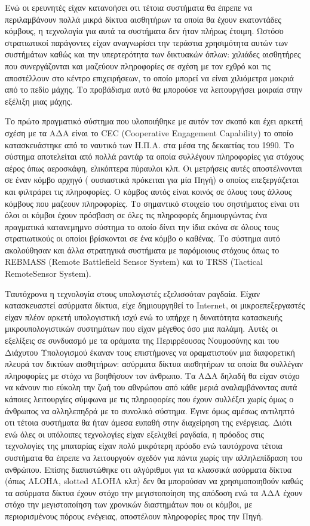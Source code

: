 Ενώ οι ερευνητές είχαν κατανοήσει οτι τέτοια συστήματα θα έπρεπε να περιλαμβάνουν πολλά μικρά δίκτυα αισθητήρων τα οποία θα έχουν εκατοντάδες κόμβους, η τεχνολογία
για αυτά τα συστήματα δεν ήταν πλήρως έτοιμη.
Ωστόσο στρατιωτικοί παράγοντες είχαν αναγνωρίσει την τεράστια χρησιμότητα αυτών των συστήμάτων καθώς και την υπερτερότητα των δικτυακών όπλων: χιλιάδες αισθητήρες που
συνεργάζονται και μαζεύουν πληροφορίες σε σχέση με τον εχθρό και τις αποστέλλουν στο κέντρο επιχειρήσεων, το οποίο μπορεί να είναι χιλιόμετρα μακριά από το πεδίο
μάχης.
Το προβάδισμα αυτό θα μπορούσε να λειτουργήσει μοιραία στην εξέλιξη μιας μάχης.

Το πρώτο πραγματικό σύστημα που υλοποιήθηκε με αυτόν τον σκοπό και έχει αρκετή σχέση με τα ΑΔΑ είναι το CEC (Cooperative Engagement Capability)\nocite{cec} το οποίο
κατασκευάστηκε από το ναυτικό των Η.Π.Α. στα μέσα της δεκαετίας του 1990.
Το σύστημα αποτελείται από πολλά ραντάρ τα οποία συλλέγουν πληροφορίες για στόχους αέρος όπως αεροσκάφη, ελικόπτερα πύραυλοι κλπ.
Οι μετρήσεις αυτές αποστέλνονται σε έναν κόμβο αρχηγό ( ουσιαστικά πρόκειται για μία Πηγή) ο οποίος επεξεργάζεται και φιλτράρει τις πληροφορίες.
Ο κόμβος αυτός είναι κοινός σε όλους τους άλλους κόμβους που μαζεουν πληροφορίες.
Το σημαντικό στοιχείο του σηστήματος είναι οτι όλοι οι κόμβοι έχουν πρόσβαση σε όλες τις πληροφορές δημιουργώντας ένα πραγματικά κατανεμημνο σύστημα το οποίο δίνει
την ίδια εκόνα σε όλους τους στρατιωτικούς οι οποίοι βρίσκονται σε ένα κόμβο ο καθένας. Το σύστημα αυτό ακολούθησαν και άλλα στρατηγικά συστήματα με παρόμοιους
στόχους όπως το REΒMASS (Remote Battlefield Sensor System) και το TRSS (Tactical RemoteSensor System).


Ταυτόχρονα η τεχνολογία στους υπολογιστές εξελισσόταν ραγδαία.
Είχαν κατασκευαστεί ασύρματα δίκτυα, είχε δημιουργηθεί το Internet, οι μικροεπεξεργαστές είχαν πλέον αρκετή υπολογιστική ισχύ ενώ το υπήρχε η δυνατότητα κατασκευής
μικρουπολογιστικών συστημάτων που είχαν μέγεθος όσο μια παλάμη.
Αυτές οι εξελίξεις σε συνδυασμό με τα οράματα της Περιρρέουσας Νουμοσύνης και του Διάχυτου Υπολογισμού έκαναν τους επιστήμονες να οραματιστούν μια διαφορετική πλευρά
τον δικτύων αισθητήρων: ασύρματα δίκτυα αισθητήρων τα οποία θα συλλέγαν πληροφορίες με στόχο να βοηθήσουν τον άνθρωπο.
Τα ΑΔΑ δηλαδή θα είχαν στόχο να κάνουν πιο εύκολη την ζωή του αθνρώπου από κάθε μεριά αναλαμβάνοντας αυτά κάποιες λειτουργίες σύμφωνα με τις πληροφορίες που έχουν
συλλέξει χωρίς όμως ο άνθρωπος να αλληλεπηδρά με το συνολικό σύστημα.
Έγινε όμως αμέσως αντιληπτό οτι τέτοια συστήματα θα ήταν άμεσα ευπαθή στην διαχείρηση της ενέργειας.
Διότι ενώ όλες οι υπόλοιπες τεχνολογίες είχαν εξελιχθεί ραγδαία, η πρόοδος στις τεχνολογίες της μπαταρίας είχαν πολύ μικρότερη πρόοδο ενώ ταυτόχρονα τέτοια συστήματα
θα έπρεπε να λειτουργούν σχεδόν για πάντα χωρίς την αλληλεπίδραση του ανθρώπου.
Επίσης διαπιστώθηκε οτι αλγόριθμοι για τα κλασσικά ασύρματα δίκτυα (όπως ALOHA, slotted ALOHA κλπ) δεν θα μπορούσαν να χρησιμοποιηθούν καθώς τα ασύρματα δίκτυα έχουν
στόχο την μεγιστοποίηση της απόδοση ενώ τα ΑΔΑ έχουν στόχο την μεγιστοποίηση των χρονικών διαστημάτων που οι κόμβοι, με περιορισμένους πόρους ενέγειας, αποστέλουν
πληροφορίες προς την Πηγή.


